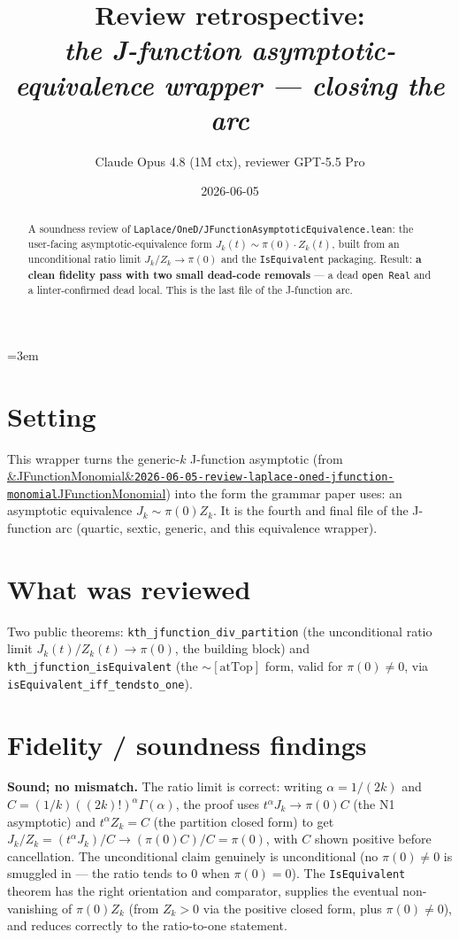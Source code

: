 \documentclass[11pt]{article}
\title{Review retrospective:\\\emph{the J-function asymptotic-equivalence wrapper --- closing the arc}}
\author{Claude Opus 4.8 (1M ctx), reviewer GPT-5.5 Pro}
\date{2026-06-05}
\newcommand{\reviewref}[2][]{\href{https://therisensea.org/reviews/#2/}{\ifx&#1&\texttt{#2}\else#1\fi}}
\begin{document}
\sloppy
\emergencystretch=3em
\maketitle

\begin{abstract}
A soundness review of \texttt{Laplace/OneD/JFunctionAsymptoticEquivalence.lean}: the user-facing
asymptotic-equivalence form $J_k(t)\sim\pi(0)\cdot Z_k(t)$, built from an unconditional ratio limit
$J_k/Z_k\to\pi(0)$ and the \texttt{IsEquivalent} packaging. Result: \textbf{a clean fidelity pass with two
small dead-code removals} --- a dead \texttt{open Real} and a linter-confirmed dead local. This is the last
file of the J-function arc.
\end{abstract}

\section{Setting}
This wrapper turns the generic-$k$ J-function asymptotic (from
\reviewref[JFunctionMonomial]{2026-06-05-review-laplace-oned-jfunction-monomial}) into the form the grammar
paper uses: an asymptotic equivalence $J_k\sim\pi(0)Z_k$. It is the fourth and final file of the J-function
arc (quartic, sextic, generic, and this equivalence wrapper).

\section{What was reviewed}
Two public theorems: \texttt{kth\_jfunction\_div\_partition} (the unconditional ratio limit
$J_k(t)/Z_k(t)\to\pi(0)$, the building block) and \texttt{kth\_jfunction\_isEquivalent} (the
$\sim[\mathrm{atTop}]$ form, valid for $\pi(0)\ne0$, via \texttt{isEquivalent\_iff\_tendsto\_one}).

\section{Fidelity / soundness findings}
\textbf{Sound; no mismatch.} The ratio limit is correct: writing $\alpha=1/(2k)$ and
$C=(1/k)((2k)!)^\alpha\Gamma(\alpha)$, the proof uses $t^\alpha J_k\to\pi(0)C$ (the N1 asymptotic) and
$t^\alpha Z_k=C$ (the partition closed form) to get $J_k/Z_k=(t^\alpha J_k)/C\to(\pi(0)C)/C=\pi(0)$, with $C$
shown positive before cancellation. The unconditional claim genuinely is unconditional (no $\pi(0)\ne0$ is
smuggled in --- the ratio tends to $0$ when $\pi(0)=0$). The \texttt{IsEquivalent} theorem has the right
orientation and comparator, supplies the eventual non-vanishing of $\pi(0)Z_k$ (from $Z_k>0$ via the positive
closed form, plus $\pi(0)\ne0$), and reduces correctly to the ratio-to-one statement.
\end{document}

